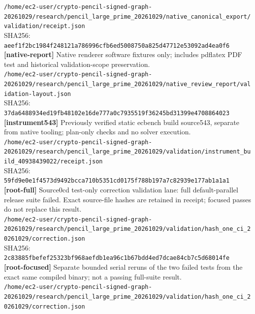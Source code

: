 \documentclass[11pt]{article}
\begin{document}
\texttt{/\allowbreak{}home/\allowbreak{}ec2-user/\allowbreak{}crypto-pencil-signed-graph-20261029/\allowbreak{}research/\allowbreak{}pencil\_large\_prime\_20261029/\allowbreak{}native\_canonical\_export/\allowbreak{}validation/\allowbreak{}receipt.json}\\
SHA256: \texttt{aeef1f2bc1984f248121a786996cfb6ed5008750a825d47712e53092ad4ea0f6}\\
\textbf{[native-report]} Native renderer software fixtures only; includes pdflatex PDF test and historical validation-scope preservation.\\
\texttt{/\allowbreak{}home/\allowbreak{}ec2-user/\allowbreak{}crypto-pencil-signed-graph-20261029/\allowbreak{}research/\allowbreak{}pencil\_large\_prime\_20261029/\allowbreak{}native\_review\_report/\allowbreak{}validation-layout.json}\\
SHA256: \texttt{37da6488934ed19fb48102e16de777a0c7935519f36245bd31399e4708864023}\\
\textbf{[instrument543]} Previously verified static ecbench build source543, separate from native tooling; plan-only checks and no solver execution.\\
\texttt{/\allowbreak{}home/\allowbreak{}ec2-user/\allowbreak{}crypto-pencil-signed-graph-20261029/\allowbreak{}research/\allowbreak{}pencil\_large\_prime\_20261029/\allowbreak{}validation/\allowbreak{}instrument\_build\_40938439022/\allowbreak{}receipt.json}\\
SHA256: \texttt{59fd9e0e1f4573d9492bcca710b5351cd0175f788b197a7c82939e177ab1a1a1}\\
\textbf{[root-full]} Source0cd test-only correction validation lane: full default-parallel release suite failed. Exact source-file hashes are retained in receipt; focused passes do not replace this result.\\
\texttt{/\allowbreak{}home/\allowbreak{}ec2-user/\allowbreak{}crypto-pencil-signed-graph-20261029/\allowbreak{}research/\allowbreak{}pencil\_large\_prime\_20261029/\allowbreak{}validation/\allowbreak{}hash\_one\_ci\_20261029/\allowbreak{}correction.json}\\
SHA256: \texttt{2c83885fbefef25323bf968aefdb1ea96c1b67bdd4ed7dcae84cb7c5d68014fe}\\
\textbf{[root-focused]} Separate bounded serial reruns of the two failed tests from the exact same compiled binary; not a passing full-suite result.\\
\texttt{/\allowbreak{}home/\allowbreak{}ec2-user/\allowbreak{}crypto-pencil-signed-graph-20261029/\allowbreak{}research/\allowbreak{}pencil\_large\_prime\_20261029/\allowbreak{}validation/\allowbreak{}hash\_one\_ci\_20261029/\allowbreak{}correction.json}\\
\end{document}
